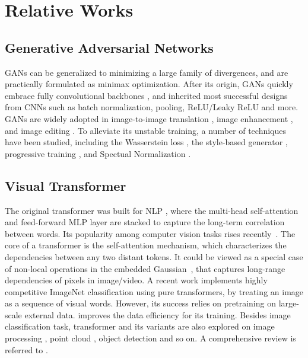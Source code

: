 \documentclass{article}
\begin{document}
\section{Relative Works}
\vspace{-0.2em}
\subsection{Generative Adversarial Networks}
\vspace{-0.2em}









GANs \cite{gui2020review} can be generalized to minimizing a large family of divergences, and are practically formulated as minimax optimization. After its origin, GANs quickly embrace fully convolutional backbones  \cite{radford2015unsupervised}, and inherited most successful designs from CNNs such as batch normalization, pooling, ReLU/Leaky ReLU and more. GANs are widely adopted in  image-to-image translation \cite{isola2017image,zhu2017unpaired}, image enhancement \cite{jiang2021enlightengan,ledig2017photo,kupyn2018deblurgan}, and image editing \cite{ouyang2018pedestrian,yu2018generative}. To alleviate its unstable training, a number of techniques have been studied, including the Wasserstein loss \cite{arjovsky2017wasserstein}, the style-based generator \cite{karras2019style}, progressive training \cite{karras2017progressive}, and Spectual Normalization \cite{miyato2018spectral}.







\subsection{Visual Transformer}
\vspace{-0.2em}
The original transformer was built for NLP \cite{vaswani2017attention}, where the multi-head self-attention and feed-forward MLP layer are stacked to capture the long-term correlation between words. Its popularity among computer vision tasks rises  recently~\cite{parmar2018image,yang2020learning,zeng2020learning,carion2020end,wu2020visual,chen2020pre}. The core of a transformer is the self-attention mechanism,  which characterizes the dependencies between any two distant tokens.  It could be viewed as a special case of non-local operations in the embedded Gaussian~\cite{wang2018non}, that captures long-range dependencies of pixels in image/video. A recent work \cite{dosovitskiy2020image} implements highly competitive ImageNet classification using pure transformers, by treating an image as a sequence of  visual words. However, its success relies on pretraining on large-scale external data. \cite{touvron2020training} improves the data efficiency for its training. Besides image classification task, transformer and its variants are also explored on image processing \cite{chen2020pre}, point cloud \cite{zhao2020point}, object detection \cite{carion2020end,zhu2020deformable} and so on. A comprehensive review is referred to \cite{han2020survey}.
\end{document}
